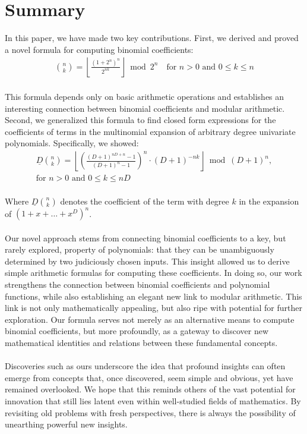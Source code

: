\documentclass{article}
\theoremstyle{plain}
\begin{document}
\section{Summary}
In this paper, we have made two key contributions. First, we derived and proved a novel formula for computing binomial coefficients:
\begin{align*}
\binom{n}{k} = \left\lfloor\frac{(1 + 2^{n})^{n}}{2^{n k}}\right\rfloor \bmod{2^{n}} \quad \text{for } n > 0 \text{ and } 0 \leq k \leq n
\end{align*}
\\
This formula depends only on basic arithmetic operations and establishes an interesting connection between binomial coefficients and modular arithmetic. 
\\
Second, we generalized this formula to find closed form expressions for the coefficients of terms in the multinomial expansion of arbitrary degree univariate polynomials. Specifically, we showed:
\begin{align*}
\underline{D}\binom{n}{k} = \left\lfloor \left(\frac{(D+1)^{nD+n} - 1}{(D+1)^{n} - 1}\right)^n \cdot (D + 1)^{-n k}\right\rfloor \bmod (D + 1)^n, \\ \text{for } n > 0 \text{ and } 0 \leq k \leq nD
\end{align*}
\\
Where \(\underline{D}\binom{n}{k}\) denotes the coefficient of the term with degree \(k\) in the expansion of \((1+x+\ldots+x^D)^n\).
\\
\\
Our novel approach stems from connecting binomial coefficients to a key, but rarely explored, property of polynomials: that they can be unambiguously determined by two judiciously chosen inputs. This insight allowed us to derive simple arithmetic formulas for computing these coefficients. In doing so, our work strengthens the connection between binomial coefficients and polynomial functions, while also establishing an elegant new link to modular arithmetic. This link is not only mathematically appealing, but also ripe with potential for further exploration. Our formula serves not merely as an alternative means to compute binomial coefficients, but more profoundly, as a gateway to discover new mathematical identities and relations between these fundamental concepts.
\\
\\
Discoveries such as ours underscore the idea that profound insights can often emerge from concepts that, once discovered, seem simple and obvious, yet have remained overlooked. We hope that this reminds others of the vast potential for innovation that still lies latent even within well-studied fields of mathematics. By revisiting old problems with fresh perspectives, there is always the possibility of unearthing powerful new insights.
\end{document}
